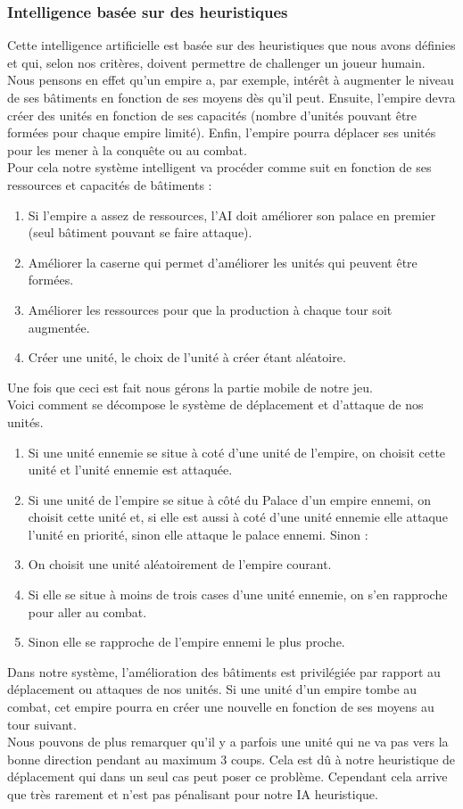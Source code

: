 \documentclass[12pt,a4paper]{article}
\begin{document}
\subsubsection{Intelligence basée sur des heuristiques}
Cette intelligence artificielle est basée sur des heuristiques que nous avons définies et qui, selon nos critères, doivent permettre de challenger un joueur humain.\\
Nous pensons en effet qu'un empire a, par exemple, intérêt à augmenter le niveau de ses bâtiments en fonction de ses moyens dès qu'il peut. Ensuite, l'empire devra créer des unités en fonction de ses capacités (nombre d'unités pouvant être formées pour chaque empire limité). Enfin, l'empire pourra  déplacer ses unités pour les mener à la conquête ou au combat. \\
Pour cela notre système intelligent va procéder comme suit en fonction de ses ressources et capacités de bâtiments : 
\begin{enumerate}
    \item Si l'empire a assez de ressources, l'AI doit améliorer son palace en premier (seul bâtiment pouvant se faire attaque).
    \item Améliorer la caserne qui permet d'améliorer les unités qui peuvent être formées. 
    \item Améliorer les ressources pour que la production à chaque tour soit augmentée.
    \item Créer une unité, le choix de l'unité à créer étant aléatoire.
\end{enumerate}
Une fois que ceci est fait nous gérons la partie mobile de notre jeu.\\Voici comment se décompose le système de déplacement et d'attaque de nos unités.
\begin{enumerate}
    \item Si une unité ennemie se situe à coté d'une unité de l'empire, on choisit cette unité et l'unité ennemie est attaquée.
    \item Si une unité de l'empire se situe à côté du Palace d'un empire ennemi, on choisit cette unité et, si elle est aussi à coté d'une unité ennemie elle attaque l'unité en priorité, sinon elle attaque le palace ennemi. Sinon : 
    \item On choisit une unité aléatoirement de l'empire courant. 
    \item Si elle se situe à moins de trois cases d'une unité ennemie, on s'en rapproche pour aller au combat.
    \item Sinon elle se rapproche de l'empire ennemi le plus proche. 
\end{enumerate}
Dans notre système, l'amélioration des bâtiments est privilégiée par rapport au déplacement ou attaques de nos unités. Si une unité d'un empire tombe au combat, cet empire pourra en créer une nouvelle en fonction de ses moyens au tour suivant.
\\Nous pouvons de plus remarquer qu'il y a parfois une unité qui ne va pas vers la bonne direction pendant au maximum 3 coups. Cela est dû à notre heuristique de déplacement qui dans un seul cas peut poser ce problème. Cependant cela arrive que très rarement et n'est pas pénalisant pour notre IA heuristique.
\end{document}
